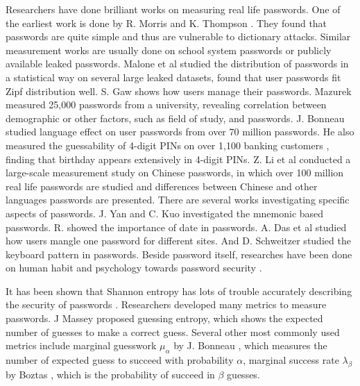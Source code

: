 \documentclass{sig-alternate}
\begin{document}
Researchers have done brilliant works on measuring real life passwords. One of the earliest work is done by R. Morris and K. Thompson \cite{morris1979password}. They found that passwords are quite simple and thus are vulnerable to dictionary attacks. Similar measurement works are usually done on school system passwords or publicly available leaked passwords. Malone et al \cite{malone2012investigating} studied the distribution of passwords in a statistical way on several large leaked datasets, found that user passwords fit Zipf distribution well. S. Gaw \cite{gaw2006password} shows how users manage their passwords. Mazurek \cite{mazurek2013measuring} measured 25,000 passwords from a university, revealing correlation between demographic or other factors, such as field of study, and passwords.   J. Bonneau \cite{bonneau2012science} studied language effect on user passwords from over 70 million passwords. He also measured the guessability of 4-digit PINs on over 1,100 banking customers \cite{bonneau2012birthday}, finding that birthday appears extensively in 4-digit PINs. Z. Li et al \cite{li2014large} conducted a large-scale measurement study on Chinese passwords, in which over 100 million real life passwords are studied and differences between Chinese and other languages passwords are presented. There are several works investigating specific aspects of passwords. J. Yan \cite{yan2004password} and C. Kuo \cite{kuo2006human} investigated the mnemonic based passwords. R.  \cite{veras2012visualizing} showed the importance of date in passwords. A. Das et al \cite{das2014tangled} studied how users mangle one password for different sites. And D. Schweitzer \cite{schweitzer2009visualizing} studied the keyboard pattern in passwords.  Beside password itself, researches have been done on human habit and psychology towards password security \cite{florencio2007large}\cite{howe2012psychology}. 

It has been shown that Shannon entropy has lots of trouble accurately describing the security of passwords \cite{cachin1997entropy}\cite{kelley2012guess}\cite{pliam2000incomparability}\cite{weir2010testing}. Researchers developed many metrics to measure passwords. J Massey \cite{massey1994guessing} proposed guessing entropy, which shows the expected number of guesses to make a correct guess. Several other most commonly used metrics include marginal guesswork $\mu_\alpha$ by J. Bonneau \cite{pliam2000incomparability}, which measures the number of expected guess to succeed with probability $\alpha$,  marginal success rate $\lambda_\beta$ by Boztas \cite{boztas1999entropies}, which is the probability of succeed in $\beta$ guesses.
\end{document}
